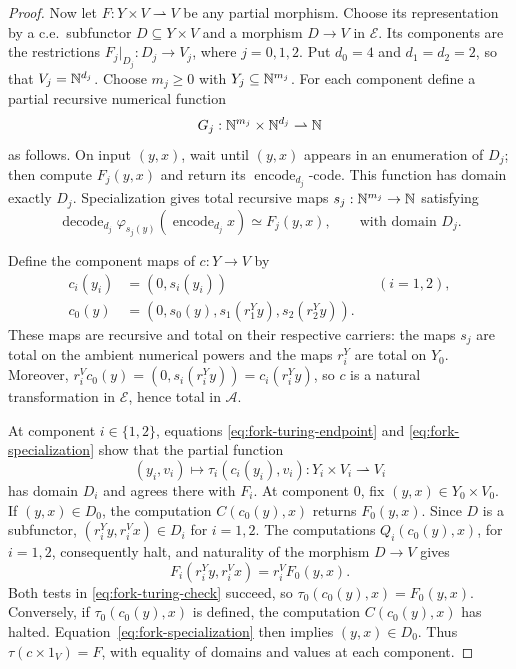 \begin{proof}
Now let $F:Y\times V\rightharpoonup V$ be any partial morphism.
Choose its representation by a c.e.\ subfunctor
$D\subseteq Y\times V$ and a morphism $D\to V$ in
$\mathcal E$. Its components are the restrictions
$F_j|_{D_j}:D_j\to V_j$, where $j=0,1,2$.
Put $d_0=4$ and $d_1=d_2=2$, so that $V_j=\mathbb N^{d_j}$.
Choose $m_j\geq0$ with $Y_j\subseteq\mathbb N^{m_j}$.
For each component define a partial recursive numerical function
\[
 G_j:\mathbb N^{m_j}\times\mathbb N^{d_j}\rightharpoonup\mathbb N
\]
as follows. On input $(y,x)$, wait until $(y,x)$ appears in an
enumeration of $D_j$; then compute $F_j(y,x)$ and return its
$\operatorname{encode}_{d_j}$-code. This function has domain
exactly $D_j$.
Specialization gives total recursive maps
$s_j:\mathbb N^{m_j}\to\mathbb N$ satisfying
\begin{equation}\label{eq:fork-specialization}
 \operatorname{decode}_{d_j}
   \varphi_{s_j(y)}(\operatorname{encode}_{d_j}x)
 \simeq F_j(y,x),
 \qquad\text{with domain }D_j.
\end{equation}

Define the component maps of $c:Y\to V$ by
\begin{align*}
 c_i(y_i)&=(0,s_i(y_i)) &&(i=1,2),\\
 c_0(y)&=(0,s_0(y),s_1(r_1^Yy),s_2(r_2^Yy)).
\end{align*}
These maps are recursive and total on their respective carriers:
the maps $s_j$ are total on the ambient numerical powers and the
maps $r_i^Y$ are total on $Y_0$. Moreover,
$r_i^Vc_0(y)=(0,s_i(r_i^Yy))=c_i(r_i^Yy)$,
so $c$ is a natural transformation in $\mathcal E$, hence total in
$\mathcal A$.

At component $i\in\{1,2\}$, equations
\eqref{eq:fork-turing-endpoint} and
\eqref{eq:fork-specialization} show that the partial function
\[
 (y_i,v_i)\longmapsto\tau_i(c_i(y_i),v_i)
 :Y_i\times V_i\rightharpoonup V_i
\]
has domain $D_i$ and agrees there with $F_i$.
At component $0$, fix $(y,x)\in Y_0\times V_0$.
If $(y,x)\in D_0$, the computation $C(c_0(y),x)$ returns $F_0(y,x)$.
Since $D$ is a subfunctor,
$(r_i^Yy,r_i^Vx)\in D_i$ for $i=1,2$.
The computations $Q_i(c_0(y),x)$, for $i=1,2$, consequently
halt, and naturality of the morphism $D\to V$ gives
\[
 F_i(r_i^Yy,r_i^Vx)=r_i^VF_0(y,x).
\]
Both tests in \eqref{eq:fork-turing-check} succeed, so
$\tau_0(c_0(y),x)=F_0(y,x)$.
Conversely, if $\tau_0(c_0(y),x)$ is defined, the computation
$C(c_0(y),x)$ has halted. Equation~\eqref{eq:fork-specialization}
then implies $(y,x)\in D_0$.
Thus $\tau(c\times1_V)=F$, with equality of domains and values
at each component.
\end{proof}

